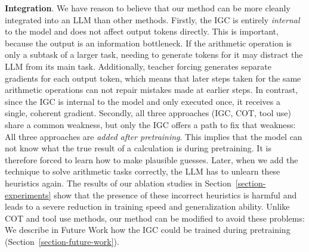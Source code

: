 \documentclass[11pt]{article}
\begin{document}
\textbf{Integration}.
We have reason to believe that our method can be more cleanly integrated into an LLM than other methods.
Firstly, the IGC is entirely \textit{internal} to the model and does not affect output tokens directly. This is important, because the output is an information bottleneck.
If the arithmetic operation is only a subtask of a larger task, needing to generate tokens for it may distract the LLM from its main task.
Additionally, teacher forcing generates separate gradients for each output token, which means that later steps taken for the same arithmetic operations can not repair mistakes made at earlier steps. In contrast, since the IGC is internal to the model and only executed once, it receives a single, coherent gradient.
Secondly, all three approaches (IGC, COT, tool use) share a common weakness, but only the IGC offers a path to fix that weakness:
All three approaches are \textit{added after pretraining}. This implies that the model can not know what the true result of a calculation is during pretraining. It is therefore forced to learn how to make plausible guesses.
Later, when we add the technique to solve arithmetic tasks correctly, the LLM has to unlearn these heuristics again.
The results of our ablation studies in Section~\ref{section-experiments} show that the presence of these incorrect heuristics is harmful and leads to a severe reduction in training speed and generalization ability.
Unlike COT and tool use methods, our method can be modified to avoid these problems:
We describe in Future Work how the IGC could be trained during pretraining (Section~\ref{section-future-work}).
\end{document}
